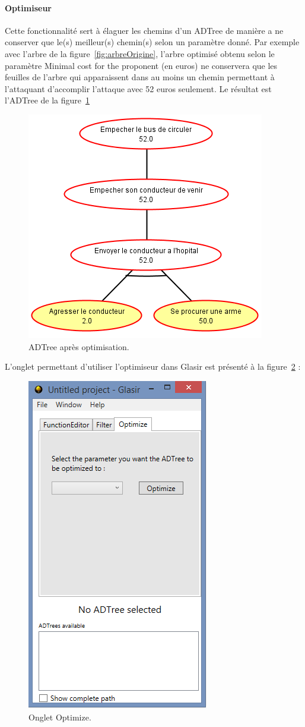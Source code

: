 \paragraph{Optimiseur} Cette fonctionnalité sert à élaguer les chemins d'un ADTree de manière a ne conserver que le(s) meilleur(s) chemin(s) selon un paramètre donné. Par exemple avec l'arbre de la {\sc figure}~\ref{fig:arbreOrigine}, l'arbre optimisé obtenu selon le paramètre \og Minimal cost for the proponent \fg (en euros) ne conservera que les feuilles de l'arbre qui apparaissent dans au moins un chemin permettant à l'attaquant d'accomplir l'attaque avec 52 euros seulement. Le résultat est l'ADTree de la {\sc figure}~\ref{fig:arbreOptim}

 \begin{figure}[H]
        \centering
        \includegraphics[height=0.5\textwidth]{figure/arbreOptimise.png}
        \caption{ADTree après optimisation.}
        \label{fig:arbreOptim}
    \end{figure}

L'onglet permettant d'utiliser l'optimiseur dans Glasir est présenté à la {\sc figure}~\ref{fig:opti} :

 \begin{figure}[H]
        \centering
        \includegraphics[height=0.7\textwidth]{figure/optimizer.png}
        \caption{Onglet Optimize.}
        \label{fig:opti}
    \end{figure}

